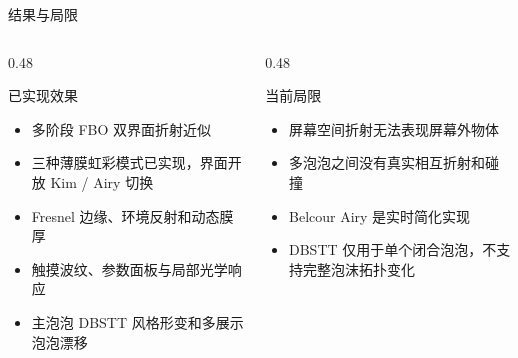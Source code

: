 \documentclass[11pt,aspectratio=169]{beamer}
\begin{document}
\begin{frame}{结果与局限}
  \begin{columns}[T]
    \begin{column}{0.48\linewidth}
      \begin{block}{已实现效果}
        \begin{itemize}
          \item 多阶段 FBO 双界面折射近似
          \item 三种薄膜虹彩模式已实现，界面开放 Kim / Airy 切换
          \item Fresnel 边缘、环境反射和动态膜厚
          \item 触摸波纹、参数面板与局部光学响应
          \item 主泡泡 DBSTT 风格形变和多展示泡泡漂移
        \end{itemize}
      \end{block}
    \end{column}
    \begin{column}{0.48\linewidth}
      \begin{block}{当前局限}
        \begin{itemize}
          \item 屏幕空间折射无法表现屏幕外物体
          \item 多泡泡之间没有真实相互折射和碰撞
          \item Belcour Airy 是实时简化实现
          \item DBSTT 仅用于单个闭合泡泡，不支持完整泡沫拓扑变化
        \end{itemize}
      \end{block}
    \end{column}
  \end{columns}
\end{frame}
\end{document}
